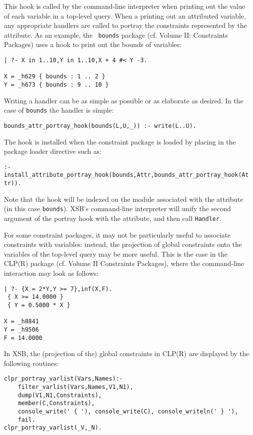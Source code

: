 \begin{description}

%
This hook is called by the command-line interpreter when printing out
the value of each variable in a top-level query.  When a printing out
an attributed variable, any appropriate handlers are called to portray
the constraints represented by the attribute.  As an example, the {\tt
  bounds} package (cf. Volume II: Constraints Packages) uses a hook to
print out the bounds of variables:
%
\begin{small}
\begin{verbatim}
| ?- X in 1..10,Y in 1..10,X + 4 #< Y -3.

X = _h629 { bounds : 1 .. 2 }
Y = _h673 { bounds : 9 .. 10 }
\end{verbatim}
\end{small}
%
Writing a handler can be as simple as possible or as elaborate as
desired.  In the case of {\tt bounds} the handler is simple:

{\small
{\tt bounds\_attr\_portray\_hook(bounds(L,U,\_)) :- write(L..U).}
}

The hook is installed when the constraint package is loaded by placing
in the package loader directive such as:

{\small
{\tt  :- install\_attribute\_portray\_hook(bounds,Attr,bounds\_attr\_portray\_hook(Attr)).}
}

Note that the hook will be indexed on the module associated with the
attribute (in this case {\tt bounds}).  XSB's command-line interpreter
will unify the second argument of the portray hook with the attribute,
and then call {\tt Handler}.

%
For some constraint packages, it may not be particularly useful to
associate constraints with variables: instead, the projection of
global constraints onto the variables of the top-level query may be
more useful.  This is the case in the CLP(R) package (cf. Volume II
Constraints Packages), where the command-line interaction may look as
follows:
%
{\small
\begin{verbatim}
| ?- {X = 2*Y,Y >= 7},inf(X,F).
 { X >= 14.0000 }
 { Y = 0.5000 * X }

X = _h8841
Y = _h9506
F = 14.0000
\end{verbatim}
}
%
In XSB, the (projection of the) global constraints in CLP(R) are
displayed by the following routines:
%
{\small
\begin{verbatim}
clpr_portray_varlist(Vars,Names):- 
	filter_varlist(Vars,Names,V1,N1),
	dump(V1,N1,Constraints),
	member(C,Constraints),
	console_write(' { '), console_write(C),	console_writeln(' } '),
	fail.
clpr_portray_varlist(_V,_N).


\end{verbatim}}
\end{description}
